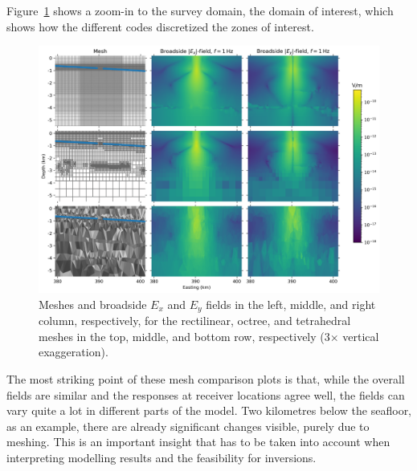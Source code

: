 \documentclass[extra, camera,%
]{gji}
\begin{document}
Figure~\ref{fig:results-marlim_survey} shows a zoom-in to the survey domain, the domain of interest, which shows how the different codes discretized the zones of interest.
%
\begin{figure}
  \centering
  \includegraphics[width=.9\linewidth]{figures/results-marlim_survey.png}
  \caption{Meshes and broadside $E_x$ and $E_y$ fields  in the left, middle, and right column, respectively, for the rectilinear, octree, and tetrahedral meshes in the top, middle, and bottom row, respectively (3$\times$ vertical exaggeration).}
  \label{fig:results-marlim_survey}
\end{figure}
%
The most striking point of these mesh comparison plots is that, while the overall fields are similar and the responses at receiver locations agree well, the fields can vary quite a lot in different parts of the model. Two kilometres below the seafloor, as an example, there are already significant changes visible, purely due to meshing. This is an important insight that has to be taken into account when interpreting modelling results and the feasibility for inversions.
\end{document}
